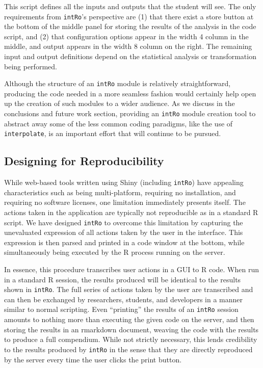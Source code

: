 \documentclass[12pt,]{article}
\newenvironment{Shaded}{\begin{snugshade}}{\end{snugshade}}
\newcommand{\KeywordTok}[1]{\textcolor[rgb]{0.13,0.29,0.53}{\textbf{{#1}}}}
\newcommand{\DecValTok}[1]{\textcolor[rgb]{0.00,0.00,0.81}{{#1}}}
\newcommand{\StringTok}[1]{\textcolor[rgb]{0.31,0.60,0.02}{{#1}}}
\newcommand{\NormalTok}[1]{{#1}}
\begin{document}
\begin{Shaded}
\end{Shaded}

This script defines all the inputs and outputs that the student will
see. The only requirements from \texttt{intRo}'s perspective are (1)
that there exist a store button at the bottom of the middle panel for
storing the results of the analysis in the code script, and (2) that
configuration options appear in the width 4 column in the middle, and
output appears in the width 8 column on the right. The remaining input
and output definitions depend on the statistical analysis or
transformation being performed.

Although the structure of an \texttt{intRo} module is relatively
straightforward, producing the code needed in a more seamless fashion
would certainly help open up the creation of such modules to a wider
audience. As we discuss in the conclusions and future work section,
providing an \texttt{intRo} module creation tool to abstract away some
of the less common coding paradigms, like the use of
\texttt{interpolate}, is an important effort that will continue to be
pursued.

\subsection{Designing for
Reproducibility}\label{designing-for-reproducibility}

While web-based tools written using Shiny (including \texttt{intRo})
have appealing characteristics such as being multi-platform, requiring
no installation, and requiring no software licenses, one limitation
immediately presents itself. The actions taken in the application are
typically not reproducible as in a standard R script. We have designed
\texttt{intRo} to overcome this limitation by capturing the unevaluated
expression of all actions taken by the user in the interface. This
expression is then parsed and printed in a code window at the bottom,
while simultaneously being executed by the R process running on the
server.

In essence, this procedure transcribes user actions in a GUI to R code.
When run in a standard R session, the results produced will be identical
to the results shown in \texttt{intRo}. The full series of actions taken
by the user are transcribed and can then be exchanged by researchers,
students, and developers in a manner similar to normal scripting. Even
``printing'' the results of an \texttt{intRo} session amounts to nothing
more than executing the given code on the server, and then storing the
results in an rmarkdown document, weaving the code with the results to
produce a full compendium. While not strictly necessary, this lends
credibility to the results produced by \texttt{intRo} in the sense that
they are directly reproduced by the server every time the user clicks
the print button.
\end{document}
